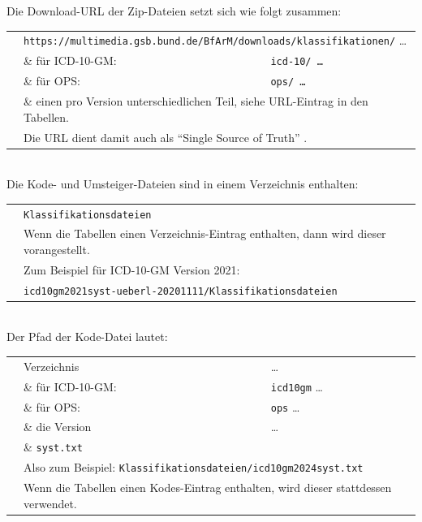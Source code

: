 Die Download-URL der Zip-Dateien setzt sich wie folgt zusammen:

\begingroup
\renewcommand{\arraystretch}{1.0}
\begin{tabular}{p{\abstandLinksDataInt}p{4cm}l}
& \multicolumn{2}{l}{\texttt{https://multimedia.gsb.bund.de/BfArM/downloads/klassifikationen/} \ldots} \\
& \& für ICD-10-GM: & \texttt{icd-10/ \ldots} \\
& \& für OPS: & \texttt{ops/ \ldots} \\
& \multicolumn{2}{l}{\& einen pro Version unterschiedlichen Teil, siehe URL-Eintrag in den Tabellen.} \\
& \multicolumn{2}{l}{Die URL dient damit auch als "`Single Source of Truth"' \citep[Seite 257]{bonnefoy2024definitive}.} \\
\end{tabular}
\endgroup \\

Die Kode- und Umsteiger-Dateien sind in einem Verzeichnis enthalten:

\begingroup
\renewcommand{\arraystretch}{1.0}
\begin{tabular}{p{\abstandLinksDataInt}l}
& \texttt{Klassifikationsdateien} \\
& Wenn die Tabellen einen Verzeichnis-Eintrag enthalten, dann wird dieser vorangestellt. \\
& Zum Beispiel für ICD-10-GM Version 2021: \\
& \texttt{icd10gm2021syst-ueberl-20201111/Klassifikationsdateien} \\
\end{tabular}
\endgroup \\

Der Pfad der Kode-Datei lautet:

\begingroup
\renewcommand{\arraystretch}{1.0}
\begin{tabular}{p{\abstandLinksDataInt}p{4cm}l}
& Verzeichnis & \ldots \\
& \& für ICD-10-GM: & \texttt{icd10gm} \ldots \\
& \& für OPS: & \texttt{ops} \ldots \\
& \& die Version & \ldots\\
& \& \texttt{syst.txt} \\
& \multicolumn{2}{l}{Also zum Beispiel: \texttt{Klassifikationsdateien/icd10gm2024syst.txt}} \\
& \multicolumn{2}{l}{Wenn die Tabellen einen Kodes-Eintrag enthalten, wird dieser stattdessen verwendet.} \\
\end{tabular}
\endgroup \\

